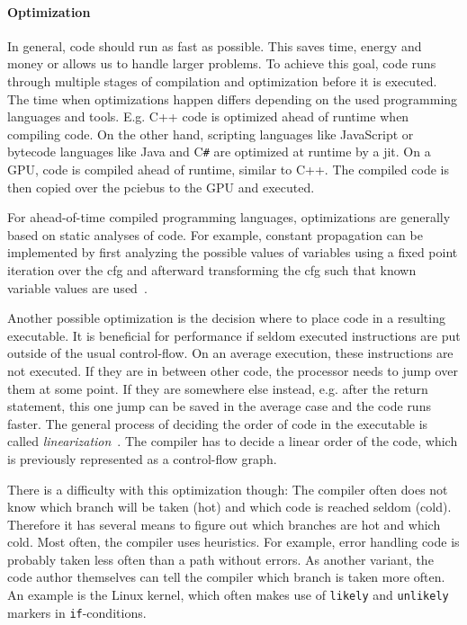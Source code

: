 \paragraph{Optimization} In general, code should run as fast as possible. This saves time, energy and money or allows us to handle larger problems.
To achieve this goal, code runs through multiple stages of compilation and optimization before it is executed.
The time when optimizations happen differs depending on the used programming languages and tools.
E.g. C++ code is optimized ahead of runtime when compiling code. On the other hand, scripting languages like JavaScript or bytecode languages like Java and C\texttt{\#} are optimized at runtime by a \gls{jit}.
On a GPU, code is compiled ahead of runtime, similar to C++. The compiled code is then copied over the \gls{pciebus} to the GPU and executed.

For ahead-of-time compiled programming languages, optimizations are generally based on static analyses of code. For example, constant propagation can be implemented by first analyzing the possible values of variables using a fixed point iteration over the \gls{cfg} and afterward transforming the \gls{cfg} such that known variable values are used~\cite{Seidl2010}.

Another possible optimization is the decision where to place code in a resulting executable.
It is beneficial for performance if seldom executed instructions are put outside of the usual control-flow.
On an average execution, these instructions are not executed.
If they are in between other code, the processor needs to jump over them at some point.
If they are somewhere else instead, e.g. after the return statement, this one jump can be saved in the average case and the code runs faster.
The general process of deciding the order of code in the executable is called \emph{linearization}~\cite{Seidl2010}.
The compiler has to decide a linear order of the code, which is previously represented as a control-flow graph.

There is a difficulty with this optimization though: The compiler often does not know which branch will be taken (hot) and which code is reached seldom (cold). Therefore it has several means to figure out which branches are hot and which cold. Most often, the compiler uses heuristics. For example, error handling code is probably taken less often than a path without errors. As another variant, the code author themselves can tell the compiler which branch is taken more often. An example is the Linux kernel, which often makes use of \texttt{likely} and \texttt{unlikely} markers in \texttt{if}-conditions.

